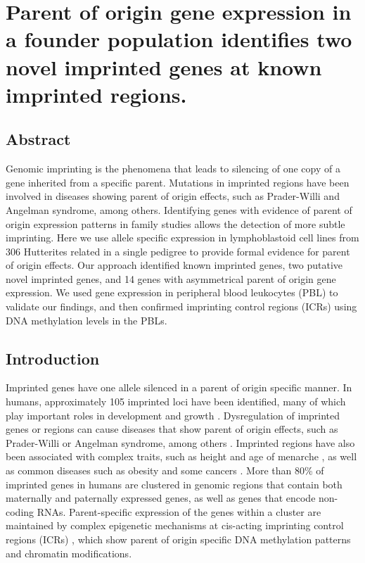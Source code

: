 \chapter{Parent of origin gene expression in a founder population identifies two novel imprinted genes at known imprinted regions.}\label{ch:imprinted}
\section[Abstract]{Abstract\footnotemark}


Genomic imprinting is the phenomena that leads to silencing of one copy of a gene inherited from a specific parent. Mutations in imprinted regions have been involved in diseases showing parent of origin effects, such as Prader-Willi and Angelman syndrome, among others. Identifying genes with evidence of parent of origin expression patterns in family studies allows the detection of more subtle imprinting. Here we use allele specific expression in lymphoblastoid cell lines from 306 Hutterites related in a single pedigree to provide formal evidence for parent of origin effects. Our approach identified known imprinted genes, two putative novel imprinted genes, and 14 genes with asymmetrical parent of origin gene expression. We used gene expression in peripheral blood leukocytes (PBL) to validate our findings, and then confirmed imprinting control regions (ICRs) using DNA methylation levels in the PBLs.



\section{Introduction}\label{ch03-introduction}
	Imprinted genes have one allele silenced in a parent of origin specific manner. In humans, approximately 105 imprinted loci have been identified, many of which play important roles in development and growth \cite{Falls1999,Peters2014}. Dysregulation of imprinted genes or regions can cause diseases that show parent of origin effects, such as Prader-Willi or Angelman syndrome, among others \cite{Peters2014}. Imprinted regions have also been associated with complex traits, such as height and age of menarche \cite{Benonisdottir:2016dz,Zoledziewska:2015do}, as well as common diseases such as obesity and some cancers \cite{Peters2014}. More than 80\% of imprinted genes in humans are clustered in genomic regions that contain both maternally and paternally expressed genes, as well as genes that encode non-coding RNAs. Parent-specific expression of the genes within a cluster are maintained by complex epigenetic mechanisms at cis-acting imprinting control regions (ICRs) \cite{Kalish:2014gd}, which show parent of origin specific DNA methylation patterns and chromatin modifications.
	
